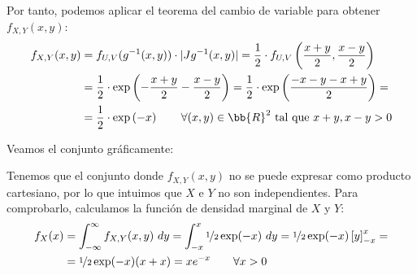 \begin{ejercicio}
    Por tanto, podemos aplicar el teorema del cambio de variable para obtener $f_{X,Y}(x,y)$:
    \begin{align*}
        f_{X,Y}(x,y) &= f_{U,V}(g^{-1}(x,y))\cdot |Jg^{-1}(x,y)|
        = \dfrac{1}{2}\cdot f_{U,V}\left(\frac{x+y}{2},\frac{x-y}{2}\right)\\
        &= \dfrac{1}{2}\cdot \exp\left(-\frac{x+y}{2}-\frac{x-y}{2}\right)
        = \dfrac{1}{2}\cdot \exp\left(\dfrac{-x-y-x+y}{2}\right)
        =\\&= \dfrac{1}{2}\cdot \exp\left(-x\right)
        \qquad \forall (x,y)\in \bb{R}^2 \text{ tal que } x+y, x-y>0
    \end{align*}

    Veamos el conjunto gráficamente:
    \begin{figure}[H]
        \centering
    \end{figure}

    Tenemos que el conjunto donde $f_{X,Y}(x,y)$ no se puede expresar como producto cartesiano, por lo que intuimos que $X$ e $Y$ no son independientes. Para comprobarlo, calculamos la función de densidad marginal de $X$ y $Y$:
    \begin{align*}
        f_X(x) &= \int_{-\infty}^{\infty} f_{X,Y}(x, y) \ dy
        = \int_{-x}^{x} \nicefrac{1}{2}\exp(-x) \ dy
        = \nicefrac{1}{2}\exp(-x)\left[y\right]_{-x}^{x}
        =\\&= \nicefrac{1}{2}\exp(-x)(x+x) = xe^{-x} \qquad \forall x>0
    \end{align*}


\end{ejercicio}
